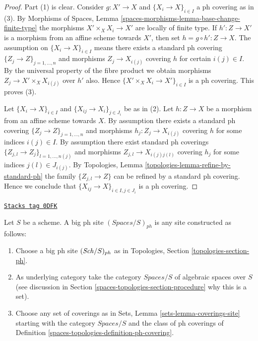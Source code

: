 \begin{proof}
Part (1) is clear. Consider $g : X' \to X$ and
$\{X_i \to X\}_{i\in I}$ a ph covering as in (3). By
Morphisms of Spaces, Lemma \ref{spaces-morphisms-lemma-base-change-finite-type}
the morphisms $X' \times_X X_i \to X'$ are locally of finite type.
If $h' : Z \to X'$ is a morphism from an affine scheme
towards $X'$, then set $h = g \circ h' : Z \to X$. The assumption
on $\{X_i \to X\}_{i\in I}$ means there exists a standard ph covering
$\{Z_j \to Z\}_{j = 1, \ldots, n}$ and morphisms $Z_j \to X_{i(j)}$ covering
$h$ for certain $i(j) \in I$. By the universal property of the fibre product
we obtain morphisms $Z_j \to X' \times_X X_{i(j)}$ over $h'$ also.
Hence $\{X' \times_X X_i \to X'\}_{i\in I}$ is a ph covering.
This proves (3).

\medskip\noindent
Let $\{X_i \to X\}_{i\in I}$ and $\{X_{ij} \to X_i\}_{j\in J_i}$ be as
in (2). Let $h : Z \to X$ be a morphism from an affine scheme towards $X$.
By assumption there exists a standard ph covering
$\{Z_j \to Z\}_{j = 1, \ldots, n}$ and morphisms $h_j : Z_j \to X_{i(j)}$
covering $h$ for some indices $i(j) \in I$. By assumption there exist
standard ph coverings
$\{Z_{j, l} \to Z_j\}_{l = 1, \ldots, n(j)}$
and morphisms $Z_{j, l} \to X_{i(j)j(l)}$ covering
$h_j$ for some indices $j(l) \in J_{i(j)}$. By
Topologies, Lemma \ref{topologies-lemma-refine-by-standard-ph}
the family $\{Z_{j, l} \to Z\}$ can be refined by a standard ph covering.
Hence we conclude that $\{X_{ij} \to X\}_{i \in I, j\in J_i}$
is a ph covering.
\end{proof}

\begin{definition}
\label{spaces-topologies-definition-big-ph-site}
\href{https://stacks.math.columbia.edu/tag/0DFK}{\texttt{Stacks tag 0DFK}}

Let $S$ be a scheme. A big ph site {\it $(\textit{Spaces}/S)_{ph}$}
is any site constructed as follows:
\begin{enumerate}
\item Choose a big ph site $(\mathit{Sch}/S)_{ph}$ as in
Topologies, Section \ref{topologies-section-ph}.
\item As underlying category take the category $\textit{Spaces}/S$
of algebraic spaces over $S$ (see discussion in
Section \ref{spaces-topologies-section-procedure} why this is a set).
\item Choose any set of coverings as in
Sets, Lemma \ref{sets-lemma-coverings-site} starting with the
category $\textit{Spaces}/S$ and the class of ph coverings
of Definition \ref{spaces-topologies-definition-ph-covering}.
\end{enumerate}
\end{definition}

